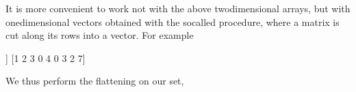 \documentclass[a4paper,12pt,polish]{jupyterBook}
\begin{document}
\sphinxAtStartPar
It is more convenient to work not with the above two\sphinxhyphen{}dimensional arrays, but with one\sphinxhyphen{}dimensional vectors obtained with the so\sphinxhyphen{}called  procedure, where a matrix is cut along its rows into a vector. For example
\begin{sphinxVerbatimInput}

\begin{sphinxVerbatim}[commandchars=\\\{\}]
\PYG{p}{[}\PYG{p}{[}\PYG{p}{]}\PYG{p}{[}\PYG{p}{]}\PYG{p}{[}\PYG{p}{]}\PYG{p}{]} 
                    
\end{sphinxVerbatim}
\end{sphinxVerbatimInput}
\begin{sphinxVerbatimOutput}

\begin{sphinxVerbatim}[commandchars=\\\{\}]
[[1 2 3]
 [0 4 0]
 [3 2 7]]
[1 2 3 0 4 0 3 2 7]
\end{sphinxVerbatim}
\end{sphinxVerbatimOutput}

\sphinxAtStartPar
We thus perform the flattening on our set,
\begin{sphinxVerbatimInput}

\begin{sphinxVerbatim}[commandchars=\\\{\}]
\end{sphinxVerbatim}
\end{sphinxVerbatimInput}
\end{document}
